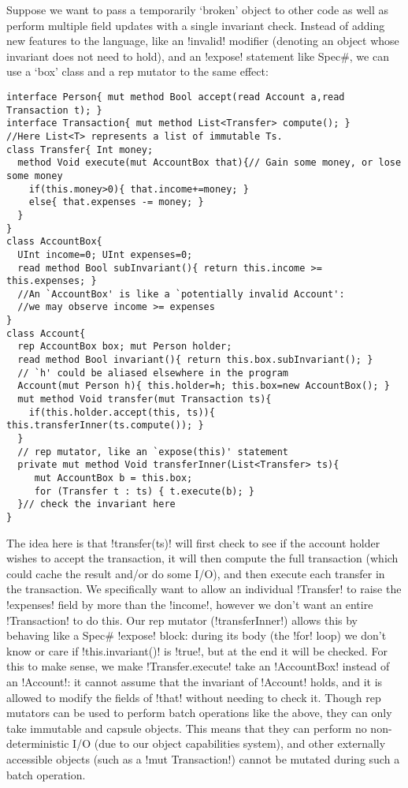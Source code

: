  Suppose we want to pass a temporarily `broken' object to other code as well as perform multiple field updates with a single invariant check. 
Instead of adding new features to the language, like an \Q!invalid! modifier (denoting an object whose invariant does not need to hold), and an \Q!expose! statement like Spec\#, we can use a `box' class and a rep mutator to the same effect:
\begin{lstlisting}
interface Person{ mut method Bool accept(read Account a,read Transaction t); }
interface Transaction{ mut method List<Transfer> compute(); }
//Here List<T> represents a list of immutable Ts.
class Transfer{ Int money;
  method Void execute(mut AccountBox that){// Gain some money, or lose some money
    if(this.money>0){ that.income+=money; }
    else{ that.expenses -= money; }
  }
}
class AccountBox{
  UInt income=0; UInt expenses=0;
  read method Bool subInvariant(){ return this.income >= this.expenses; }
  //An `AccountBox' is like a `potentially invalid Account':
  //we may observe income >= expenses
}
class Account{
  rep AccountBox box; mut Person holder;
  read method Bool invariant(){ return this.box.subInvariant(); }
  // `h' could be aliased elsewhere in the program
  Account(mut Person h){ this.holder=h; this.box=new AccountBox(); }
  mut method Void transfer(mut Transaction ts){
    if(this.holder.accept(this, ts)){ this.transferInner(ts.compute()); }
  }
  // rep mutator, like an `expose(this)' statement
  private mut method Void transferInner(List<Transfer> ts){
     mut AccountBox b = this.box;
     for (Transfer t : ts) { t.execute(b); }
  }// check the invariant here
}
\end{lstlisting}
The idea here is that \Q!transfer(ts)! will first check to see if the account holder wishes to accept the transaction, it will then compute the full transaction (which could cache the result and/or do some I/O), and then execute each transfer in the transaction. We specifically want to allow an individual \Q!Transfer! to raise the \Q!expenses! field by more than the \Q!income!, however we don't want an entire \Q!Transaction! to do this. 
Our rep mutator (\Q!transferInner!) allows this by behaving like a Spec\# \Q!expose! block: during its body (the \Q!for! loop) we don't know or care if \Q!this.invariant()! is \Q!true!, but at the end it will be checked. For this to make sense, we make \Q!Transfer.execute! take an \Q!AccountBox! instead of an \Q!Account!: it cannot assume that the invariant of \Q!Account! holds, and it is allowed to modify the fields of \Q!that! without needing to check it. Though rep mutators can be used to perform batch operations like the above, they can only take immutable and capsule objects. This means that they can perform no non-deterministic I/O (due to our object capabilities system), and other externally accessible objects (such as a \Q!mut Transaction!) cannot be mutated during such a batch operation.

